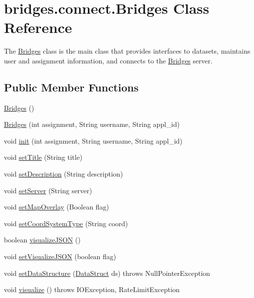 \hypertarget{classbridges_1_1connect_1_1_bridges}{}\section{bridges.\+connect.\+Bridges Class Reference}
\label{classbridges_1_1connect_1_1_bridges}


The \mbox{\hyperlink{classbridges_1_1connect_1_1_bridges}{Bridges}} class is the main class that provides interfaces to datasets, maintains user and assignment information, and connects to the \mbox{\hyperlink{classbridges_1_1connect_1_1_bridges}{Bridges}} server.  


\subsection*{Public Member Functions}
\begin{DoxyCompactItemize}
\item 
\mbox{\hyperlink{classbridges_1_1connect_1_1_bridges_a42f0592841a829f93453506c78951b1f}{Bridges}} ()
\item 
\mbox{\hyperlink{classbridges_1_1connect_1_1_bridges_a4c47eb7cbb94c5810dc38c38760db872}{Bridges}} (int assignment, String username, String appl\+\_\+id)
\item 
void \mbox{\hyperlink{classbridges_1_1connect_1_1_bridges_a87aa73367a43cfc8b3ae5e4926ea4895}{init}} (int assignment, String username, String appl\+\_\+id)
\item 
void \mbox{\hyperlink{classbridges_1_1connect_1_1_bridges_aed3752ee6318a48dff271d9a9e2a8fcc}{set\+Title}} (String title)
\item 
void \mbox{\hyperlink{classbridges_1_1connect_1_1_bridges_a50d1d5aa64d312393b63d1be854e34a2}{set\+Description}} (String description)
\item 
void \mbox{\hyperlink{classbridges_1_1connect_1_1_bridges_ab43e412448e1dfc340e58c407519a576}{set\+Server}} (String server)
\item 
void \mbox{\hyperlink{classbridges_1_1connect_1_1_bridges_a4af383ba2f114ad7bd4e08eb44096973}{set\+Map\+Overlay}} (Boolean flag)
\item 
void \mbox{\hyperlink{classbridges_1_1connect_1_1_bridges_ade4a9c43e2b608e6b3dc774b73f95749}{set\+Coord\+System\+Type}} (String coord)
\item 
boolean \mbox{\hyperlink{classbridges_1_1connect_1_1_bridges_afd3c63780396e92c94c923037385b31d}{visualize\+J\+S\+ON}} ()
\item 
void \mbox{\hyperlink{classbridges_1_1connect_1_1_bridges_aa502aa32a9ac482da9c8455c6810b64d}{set\+Visualize\+J\+S\+ON}} (boolean flag)
\item 
void \mbox{\hyperlink{classbridges_1_1connect_1_1_bridges_a921a6603b2445b1abe30a1b3d6f0c255}{set\+Data\+Structure}} (\mbox{\hyperlink{classbridges_1_1base_1_1_data_struct}{Data\+Struct}} ds)  throws Null\+Pointer\+Exception 
\item 
void \mbox{\hyperlink{classbridges_1_1connect_1_1_bridges_a1853d64ffb8675ba2ec227a2b819cd24}{visualize}} ()  throws I\+O\+Exception, Rate\+Limit\+Exception 
\end{DoxyCompactItemize}
